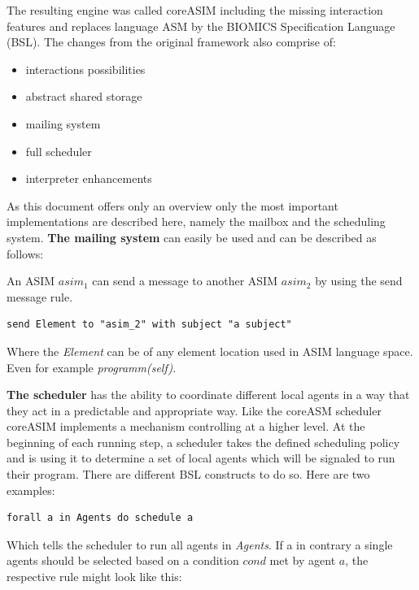 The resulting engine was called coreASIM including the missing interaction features \cite{BIOMICSD42}\cite{BIOMICSD52} and replaces language ASM by the BIOMICS Specification Language (BSL). The changes from the original framework also comprise of:

\begin{itemize}
	\item interactions possibilities
	\item abstract shared storage
	\item mailing system
	\item full scheduler
	\item interpreter enhancements
\end{itemize}

As this document offers only an overview only the most important implementations are described here, namely the mailbox and the scheduling system. \textbf{The mailing system} can easily be used and can be described as follows:

\begin{minipage}{1.0\textwidth}
An ASIM $asim_1$ can send a message to another ASIM $asim_2$ by using the send message rule.\nopagebreak
\begin{lstlisting}[language=bsl]
	send Element to "asim_2" with subject "a subject"
\end{lstlisting}

Where the \textit{Element} can be of any element location used in ASIM language space. Even for example \textit{programm(self)}.
\end{minipage}

\textbf{The scheduler} has the ability to coordinate different local agents in a way that they act in a predictable and appropriate way. Like the coreASM scheduler coreASIM implements a mechanism controlling at a higher level. At the beginning of each running step, a scheduler takes the defined scheduling policy and is using it to determine a set of local agents which will be signaled to run their program. There are different BSL constructs to do so. Here are two examples:

\begin{lstlisting}[language=bsl]
	forall a in Agents do schedule a
\end{lstlisting}

Which tells the scheduler to run all agents in \textit{Agents}. If a in contrary a single agents should be selected based on a condition $cond$ met by agent $a$, the respective rule might look like this:

